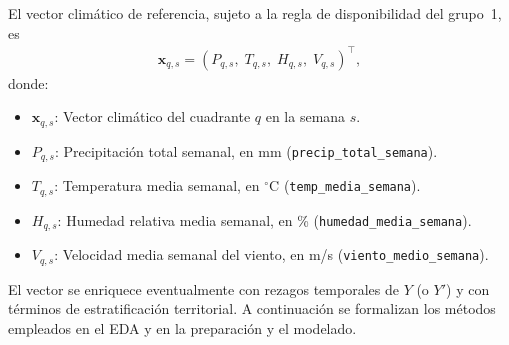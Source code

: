 El vector climático de referencia, sujeto a la regla de disponibilidad del grupo~1, es
\begin{equation}
    \begin{aligned}
    \mathbf{x}_{q,s} = \left( P_{q,s},\; T_{q,s},\; H_{q,s},\; V_{q,s} \right)^{\top},
    \end{aligned}
    \label{eq:vector_clima}
\end{equation}
donde:
\begin{itemize}
    \item $\mathbf{x}_{q,s}$: Vector climático del cuadrante $q$ en la semana $s$.
    \item $P_{q,s}$: Precipitación total semanal, en mm (\texttt{precip\_total\_semana}).
    \item $T_{q,s}$: Temperatura media semanal, en $^{\circ}$C (\texttt{temp\_media\_semana}).
    \item $H_{q,s}$: Humedad relativa media semanal, en \% (\texttt{humedad\_media\_semana}).
    \item $V_{q,s}$: Velocidad media semanal del viento, en m/s (\texttt{viento\_medio\_semana}).
\end{itemize}
El vector se enriquece eventualmente con rezagos temporales de $Y$ (o $Y'$) y con términos de estratificación territorial. A continuación se formalizan los métodos empleados en el EDA y en la preparación y el modelado.

